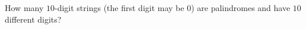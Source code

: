 How many $10$-digit strings (the first digit may be $0$) are palindromes and have $10$ different digits?
